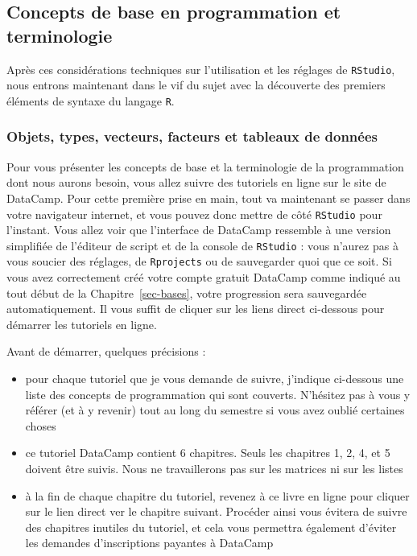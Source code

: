 \documentclass[
  letterpaper,
  DIV=11,
  numbers=noendperiod]{scrreprt}
\providecommand{\tightlist}{%
  \setlength{\itemsep}{0pt}\setlength{\parskip}{0pt}}\usepackage{longtable,booktabs,array}
\begin{document}
\hypertarget{concepts-de-base-en-programmation-et-terminologie}{%
\subsection{Concepts de base en programmation et
terminologie}\label{concepts-de-base-en-programmation-et-terminologie}}

Après ces considérations techniques sur l'utilisation et les réglages de
\texttt{RStudio}, nous entrons maintenant dans le vif du sujet avec la
découverte des premiers éléments de syntaxe du langage \texttt{R}.

\hypertarget{sec-objects}{%
\subsubsection{Objets, types, vecteurs, facteurs et tableaux de
données}\label{sec-objects}}

Pour vous présenter les concepts de base et la terminologie de la
programmation dont nous aurons besoin, vous allez suivre des tutoriels
en ligne sur le site de DataCamp. Pour cette première prise en main,
tout va maintenant se passer dans votre navigateur internet, et vous
pouvez donc mettre de côté \texttt{RStudio} pour l'instant. Vous allez
voir que l'interface de DataCamp ressemble à une version simplifiée de
l'éditeur de script et de la console de \texttt{RStudio} : vous n'aurez
pas à vous soucier des réglages, de \texttt{Rprojects} ou de sauvegarder
quoi que ce soit. Si vous avez correctement créé votre compte gratuit
DataCamp comme indiqué au tout début de la Chapitre~\ref{sec-bases},
votre progression sera sauvegardée automatiquement. Il vous suffit de
cliquer sur les liens direct ci-dessous pour démarrer les tutoriels en
ligne.

Avant de démarrer, quelques précisions :

\begin{itemize}
\tightlist
\item
  pour chaque tutoriel que je vous demande de suivre, j'indique
  ci-dessous une liste des concepts de programmation qui sont couverts.
  N'hésitez pas à vous y référer (et à y revenir) tout au long du
  semestre si vous avez oublié certaines choses
\item
  ce tutoriel DataCamp contient 6 chapitres. Seuls les chapitres 1, 2,
  4, et 5 doivent être suivis. Nous ne travaillerons pas sur les
  matrices ni sur les listes
\item
  à la fin de chaque chapitre du tutoriel, revenez à ce livre en ligne
  pour cliquer sur le lien direct ver le chapitre suivant. Procéder
  ainsi vous évitera de suivre des chapitres inutiles du tutoriel, et
  cela vous permettra également d'éviter les demandes d'inscriptions
  payantes à DataCamp
\end{itemize}
\end{document}
